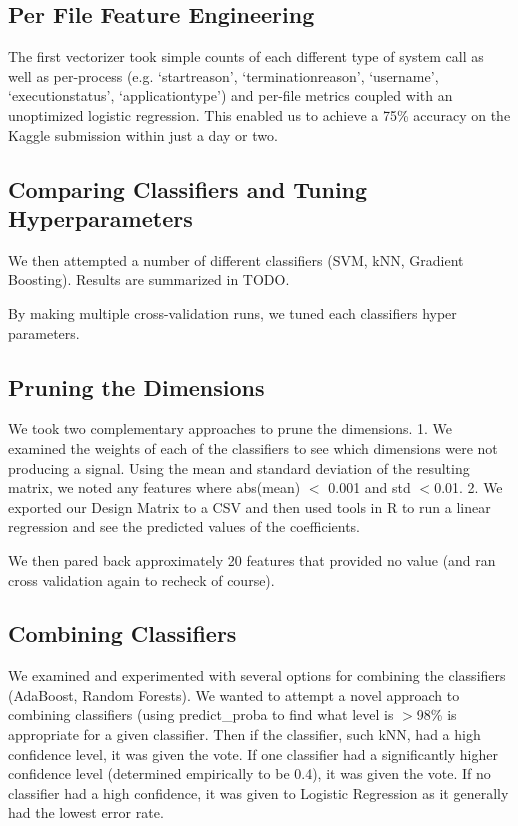 \documentclass[11pt, oneside]{article}   	%
\begin{document}
\subsection*{Per File Feature Engineering}

The first vectorizer took simple counts of each different type of system call as well as per-process (e.g. `startreason', `terminationreason', `username', `executionstatus', `applicationtype') and per-file metrics coupled with an unoptimized logistic regression. This enabled us to achieve a 75\% accuracy on the Kaggle submission within just a day or two.

\subsection*{Comparing Classifiers and Tuning Hyperparameters}

We then attempted a number of different classifiers (SVM, kNN, Gradient Boosting). Results are summarized in TODO.

By making multiple cross-validation runs, we tuned each classifiers hyper parameters.

\subsection*{Pruning the Dimensions}

We took two complementary approaches to prune the dimensions.
1. We examined the weights of each of the classifiers to see which dimensions were not producing a signal. Using the mean and standard deviation of the resulting matrix, we noted any features where abs(mean) $<$ 0.001 and std $< $0.01.
2. We exported our Design Matrix to a CSV and then used tools in R to run a linear regression and see the predicted values of the coefficients. 

We then pared back approximately 20 features that provided no value (and ran cross validation again to recheck of course).

\subsection*{Combining Classifiers}

We examined and experimented with several options for combining the classifiers (AdaBoost, Random Forests). We wanted to attempt a novel approach to combining classifiers (using predict\_proba to find what level is $>$98\% is appropriate for a given classifier. Then if the classifier, such kNN, had a high confidence level, it was given the vote. If one classifier had a significantly higher confidence level (determined empirically to be 0.4), it was given the vote. If no classifier had a high confidence, it was given to Logistic Regression as it generally had the lowest error rate.
\end{document}
